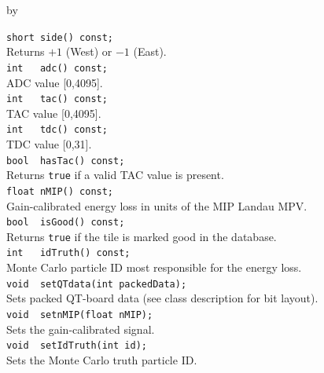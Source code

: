 \documentclass[twoside]{article}
\newcommand{\entrylabel}[1]{\mbox{\textbf{{#1}}}\hfil}%
\newenvironment{entry}
{\begin{list}{}%
    {\renewcommand{\makelabel}{\entrylabel}%
     \setlength{\labelwidth}{90pt}%
     \setlength{\leftmargin}{\labelwidth}
     \advance\leftmargin by \labelsep%
      }%
    }%
  {\end{list}}
\newcommand{\Entrylabel}[1]%
{\raisebox{0pt}[1ex][0pt]{\makebox[\labelwidth][l]%
    {\parbox[t]{\labelwidth}{\hspace{0pt}\textbf{{#1}}}}}}
\newenvironment{Entry}%
{\renewcommand{\entrylabel}{\Entrylabel}\begin{entry}}%
  {\end{entry}}
\begin{document}
\begin{Entry}
    \verb+short side() const;+\\
    Returns $+1$ (West) or $-1$ (East).\\
    \verb+int   adc() const;+\\
    ADC value [0,4095].\\
    \verb+int   tac() const;+\\
    TAC value [0,4095].\\
    \verb+int   tdc() const;+\\
    TDC value [0,31].\\
    \verb+bool  hasTac() const;+\\
    Returns \verb+true+ if a valid TAC value is present.\\
    \verb+float nMIP() const;+\\
    Gain-calibrated energy loss in units of the MIP Landau MPV.\\
    \verb+bool  isGood() const;+\\
    Returns \verb+true+ if the tile is marked good in the database.\\
    \verb+int   idTruth() const;+\\
    Monte Carlo particle ID most responsible for the energy loss.\\
    \verb+void  setQTdata(int packedData);+\\
    Sets packed QT-board data (see class description for bit layout).\\
    \verb+void  setnMIP(float nMIP);+\\
    Sets the gain-calibrated signal.\\
    \verb+void  setIdTruth(int id);+\\
    Sets the Monte Carlo truth particle ID.\\
\end{Entry}
\clearpage

\end{document}
